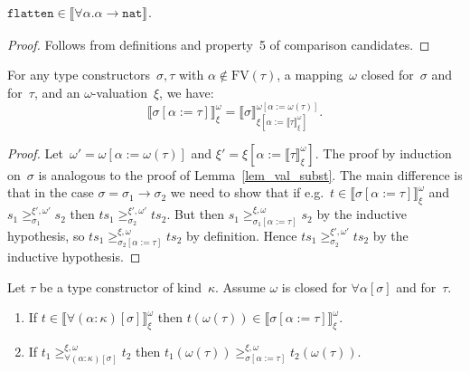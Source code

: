 \documentclass[a4paper,UKenglish,cleveref,autoref,numberwithinsect]{lipics-v2019}
\theoremstyle{definition}
\newcommand{\arrtype}{\rightarrow}
\newcommand{\subst}[2]{#1:=#2}
\newcommand{\nat}{\mathtt{nat}}
\newcommand{\flatten}{\mathtt{flatten}}
\newcommand{\FV}{\mathrm{FV}}
\newcommand{\val}[3]{\ensuremath{\llbracket#1\rrbracket_{#2}^{#3}}}
\newcommand{\gteq}[3]{\ensuremath{\ge_{#1}^{#2,#3}}}
\begin{document}
\begin{lemma}\label{lem_wm_flatten}
  $\flatten \in \val{\forall\alpha.\alpha\arrtype\nat}{}{}$.
\end{lemma}

\begin{proof}
  Follows from definitions and property~5 of comparison candidates.
\end{proof}

\begin{lemma}\label{lem_val_subst_wm}
  For any type constructors~$\sigma,\tau$ with $\alpha \notin
  \FV(\tau)$, a mapping~$\omega$ closed for~$\sigma$ and for~$\tau$,
  and an $\omega$-valuation~$\xi$, we have:
  \[
  \val{\sigma[\subst{\alpha}{\tau}]}{\xi}{\omega} =
  \val{\sigma}{\xi[\subst{\alpha}{\val{\tau}{\xi}{\omega}}]}{\omega[\subst{\alpha}{\omega(\tau)}]}.
  \]
\end{lemma}

\begin{proof}
  Let~$\omega' = \omega[\subst{\alpha}{\omega(\tau)}]$ and $\xi' =
  \xi[\subst{\alpha}{\val{\tau}{\xi}{\omega}}]$. The proof by
  induction on~$\sigma$ is analogous to the proof of
  Lemma~\ref{lem_val_subst}. The main difference is that in the case
  $\sigma = \sigma_1\arrtype\sigma_2$ we need to show that if e.g.~$t
  \in \val{\sigma[\subst{\alpha}{\tau}]}{\xi}{\omega}$ and $s_1
  \gteq{\sigma_1}{\xi'}{\omega'} s_2$ then $t s_1
  \gteq{\sigma_2}{\xi'}{\omega'} t s_2$. But then $s_1
  \gteq{\sigma_1[\subst{\alpha}{\tau}]}{\xi}{\omega} s_2$ by the
  inductive hypothesis, so $t s_1
  \gteq{\sigma_2[\subst{\alpha}{\tau}]}{\xi}{\omega} t s_2$ by
  definition. Hence $t s_1 \gteq{\sigma_2}{\xi'}{\omega'} t s_2$ by
  the inductive hypothesis.
\end{proof}

\begin{lemma}\label{lem_wm_forall}
  Let $\tau$ be a type constructor of kind~$\kappa$. Assume $\omega$
  is closed for $\forall\alpha[\sigma]$ and for~$\tau$.
  \begin{enumerate}
  \item If $t \in \val{\forall(\alpha:\kappa)[\sigma]}{\xi}{\omega}$
    then $t (\omega(\tau)) \in
    \val{\sigma[\subst{\alpha}{\tau}]}{\xi}{\omega}$.
  \item If $t_1 \gteq{\forall(\alpha:\kappa)[\sigma]}{\xi}{\omega}
    t_2$ then $t_1 (\omega(\tau))
    \gteq{\sigma[\subst{\alpha}{\tau}]}{\xi}{\omega} t_2
    (\omega(\tau))$.
  \end{enumerate}
\end{lemma}
\end{document}
